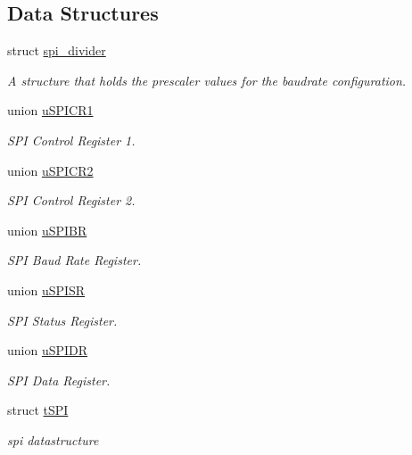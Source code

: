 \subsection*{Data Structures}
\begin{DoxyCompactItemize}
\item 
struct \hyperlink{structspi__divider}{spi\+\_\+divider}
\begin{DoxyCompactList}\small\item\em A structure that holds the prescaler values for the baudrate configuration. \end{DoxyCompactList}\item 
union \hyperlink{unionu_s_p_i_c_r1}{u\+S\+P\+I\+C\+R1}
\begin{DoxyCompactList}\small\item\em S\+P\+I Control Register 1. \end{DoxyCompactList}\item 
union \hyperlink{unionu_s_p_i_c_r2}{u\+S\+P\+I\+C\+R2}
\begin{DoxyCompactList}\small\item\em S\+P\+I Control Register 2. \end{DoxyCompactList}\item 
union \hyperlink{unionu_s_p_i_b_r}{u\+S\+P\+I\+B\+R}
\begin{DoxyCompactList}\small\item\em S\+P\+I Baud Rate Register. \end{DoxyCompactList}\item 
union \hyperlink{unionu_s_p_i_s_r}{u\+S\+P\+I\+S\+R}
\begin{DoxyCompactList}\small\item\em S\+P\+I Status Register. \end{DoxyCompactList}\item 
union \hyperlink{unionu_s_p_i_d_r}{u\+S\+P\+I\+D\+R}
\begin{DoxyCompactList}\small\item\em S\+P\+I Data Register. \end{DoxyCompactList}\item 
struct \hyperlink{structt_s_p_i}{t\+S\+P\+I}
\begin{DoxyCompactList}\small\item\em spi datastructure \end{DoxyCompactList}\end{DoxyCompactItemize}
